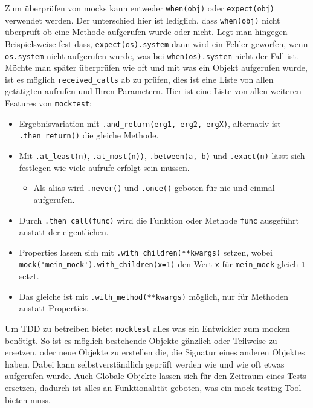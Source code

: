 Zum überprüfen von \Glspl{mock} kann entweder \lstinline{when(obj)} oder \lstinline{expect(obj)} verwendet werden. Der
unterschied hier ist lediglich, dass \lstinline{when(obj)} nicht überprüft ob eine Methode aufgerufen wurde oder nicht.
Legt man hingegen Beispielsweise fest dass, \lstinline{expect(os).system} dann wird ein Fehler geworfen, wenn
\lstinline{os.system} nicht aufgerufen wurde, was bei \lstinline{when(os).system} nicht der Fall ist. Möchte man später
überprüfen wie oft und mit was ein Objekt aufgerufen wurde, ist es möglich \lstinline{received_calls} ab zu prüfen, dies
ist eine Liste von allen getätigten aufrufen und Ihren Parametern.
\noindent
Hier ist eine Liste von allen weiteren Features von \lstinline{mocktest}:
\begin{itemize}
    \item Ergebnisvariation mit \lstinline{.and_return(erg1, erg2, ergX)}, alternativ ist \lstinline{.then_return()} die gleiche Methode.
    \item Mit \lstinline{.at_least(n)}, \lstinline{.at_most(n))}, \lstinline{.between(a, b)} und \lstinline{.exact(n)} lässt sich festlegen
        wie viele aufrufe erfolgt sein müssen.
    \begin{itemize}
        \item Als alias wird \lstinline{.never()} und \lstinline{.once()} geboten für nie und einmal aufgerufen.
    \end{itemize}
    \item Durch \lstinline{.then_call(func)} wird die Funktion oder Methode \lstinline{func} ausgeführt anstatt der eigentlichen.
    \item Properties lassen sich mit \lstinline{.with_children(**kwargs)} setzen, wobei \lstinline{mock('mein_mock').with_children(x=1)}
        den Wert \lstinline{x}  für \lstinline{mein_mock} gleich \lstinline{1} setzt.
    \item Das gleiche ist mit \lstinline{.with_method(**kwargs)} möglich, nur für Methoden anstatt Properties.
\end{itemize}

Um TDD zu betreiben bietet \lstinline{mocktest} alles was ein Entwickler zum \gls{mock}en benötigt. So ist es möglich
bestehende Objekte gänzlich oder Teilweise zu ersetzen, oder neue Objekte zu erstellen die, die Signatur eines anderen
Objektes haben. Dabei kann selbstverständlich geprüft werden wie und wie oft etwas aufgerufen wurde. Auch Globale Objekte
lassen sich für den Zeitraum eines Tests ersetzen, dadurch ist alles an Funktionalität geboten, was ein \gls{mock}-testing
Tool bieten muss.

